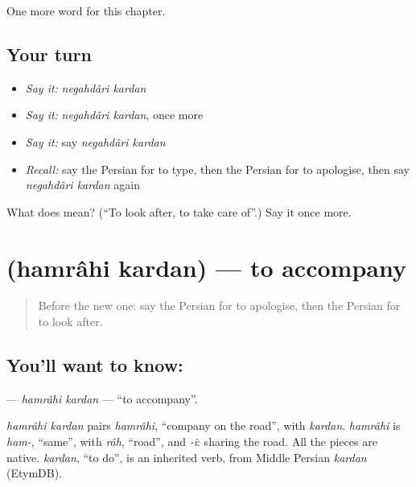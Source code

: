 \begin{grammarlens}[title={What you've built}]
One more word for this chapter.
\end{grammarlens}

\subsection*{Your turn}
\begin{itemize}
\raggedright
  \item \emph{Say it:} \emph{negahdâri kardan}
  \item \emph{Say it:} \emph{negahdâri kardan}, once more
  \item \emph{Say it:} say \emph{negahdâri kardan}
  \item \emph{Recall:} say the Persian for to type, then the Persian for to apologise, then say \emph{negahdâri kardan} again
\end{itemize}

\begin{tcolorbox}[breakable,colback=teal!4,colframe=teal!35!black,title={Before you move on}]
What does   mean? (\textquotedblleft{}To look after, to take care of\textquotedblright{}.) Say it once more.
\end{tcolorbox}
\section[\texorpdfstring{\fa{همراهی} \fa{کردن} (hamrâhi kardan)}{همراهی کردن (hamrâhi kardan)}]{  (hamrâhi kardan) — to accompany}

\label{lesson:FA-C145-hamrahi-kardan}



\begin{quote}
Before the new one: say the Persian for to apologise, then the Persian for to look after.
\end{quote}

\subsection*{You'll want to know:  }
\textbf{ } — \emph{hamrâhi kardan} — \textquotedblleft{}to accompany\textquotedblright{}.

\begin{cousinweb}
\emph{hamrâhi kardan} pairs \emph{hamrâhi}, \textquotedblleft{}company on the road\textquotedblright{}, with \emph{kardan}. \emph{hamrâhi} is \emph{ham-}, \textquotedblleft{}same\textquotedblright{}, with \emph{râh}, \textquotedblleft{}road\textquotedblright{}, and \emph{-i}: sharing the road. All the pieces are native. \emph{kardan}, \textquotedblleft{}to do\textquotedblright{}, is an inherited verb, from Middle Persian \emph{kardan} (EtymDB).
\end{cousinweb}

